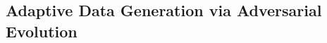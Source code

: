 \documentclass[lettersize,journal]{IEEEtran}
\begin{document}

\subsection{Adaptive Data Generation via Adversarial Evolution}
\label{subsec:data_generation}
\end{document}
